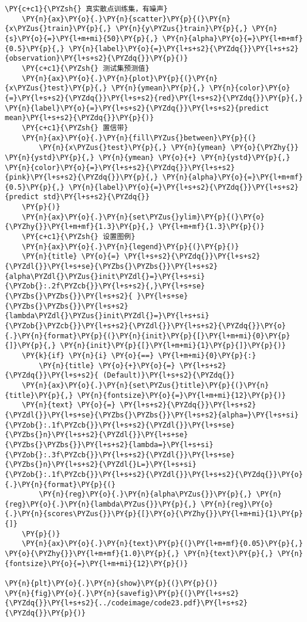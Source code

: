 \begin{Verbatim}[commandchars=\\\{\}]
    \PY{c+c1}{\PYZsh{} 真实散点训练集，有噪声}
    \PY{n}{ax}\PY{o}{.}\PY{n}{scatter}\PY{p}{(}\PY{n}{x\PYZus{}train}\PY{p}{,} \PY{n}{y\PYZus{}train}\PY{p}{,} \PY{n}{s}\PY{o}{=}\PY{l+m+mi}{50}\PY{p}{,} \PY{n}{alpha}\PY{o}{=}\PY{l+m+mf}{0.5}\PY{p}{,} \PY{n}{label}\PY{o}{=}\PY{l+s+s2}{\PYZdq{}}\PY{l+s+s2}{observation}\PY{l+s+s2}{\PYZdq{}}\PY{p}{)}
    \PY{c+c1}{\PYZsh{} 测试集预测值}
    \PY{n}{ax}\PY{o}{.}\PY{n}{plot}\PY{p}{(}\PY{n}{x\PYZus{}test}\PY{p}{,} \PY{n}{ymean}\PY{p}{,} \PY{n}{color}\PY{o}{=}\PY{l+s+s2}{\PYZdq{}}\PY{l+s+s2}{red}\PY{l+s+s2}{\PYZdq{}}\PY{p}{,} \PY{n}{label}\PY{o}{=}\PY{l+s+s2}{\PYZdq{}}\PY{l+s+s2}{predict mean}\PY{l+s+s2}{\PYZdq{}}\PY{p}{)}
    \PY{c+c1}{\PYZsh{} 置信带}
    \PY{n}{ax}\PY{o}{.}\PY{n}{fill\PYZus{}between}\PY{p}{(}
        \PY{n}{x\PYZus{}test}\PY{p}{,} \PY{n}{ymean} \PY{o}{\PYZhy{}} \PY{n}{ystd}\PY{p}{,} \PY{n}{ymean} \PY{o}{+} \PY{n}{ystd}\PY{p}{,} \PY{n}{color}\PY{o}{=}\PY{l+s+s2}{\PYZdq{}}\PY{l+s+s2}{pink}\PY{l+s+s2}{\PYZdq{}}\PY{p}{,} \PY{n}{alpha}\PY{o}{=}\PY{l+m+mf}{0.5}\PY{p}{,} \PY{n}{label}\PY{o}{=}\PY{l+s+s2}{\PYZdq{}}\PY{l+s+s2}{predict std}\PY{l+s+s2}{\PYZdq{}}
    \PY{p}{)}
    \PY{n}{ax}\PY{o}{.}\PY{n}{set\PYZus{}ylim}\PY{p}{(}\PY{o}{\PYZhy{}}\PY{l+m+mf}{1.3}\PY{p}{,} \PY{l+m+mf}{1.3}\PY{p}{)}
    \PY{c+c1}{\PYZsh{} 设置图例}
    \PY{n}{ax}\PY{o}{.}\PY{n}{legend}\PY{p}{(}\PY{p}{)}
    \PY{n}{title} \PY{o}{=} \PY{l+s+s2}{\PYZdq{}}\PY{l+s+s2}{\PYZdl{}}\PY{l+s+se}{\PYZbs{}\PYZbs{}}\PY{l+s+s2}{alpha\PYZdl{}\PYZus{}init\PYZdl{}=}\PY{l+s+si}{\PYZob{}:.2f\PYZcb{}}\PY{l+s+s2}{,}\PY{l+s+se}{\PYZbs{}\PYZbs{}}\PY{l+s+s2}{ }\PY{l+s+se}{\PYZbs{}\PYZbs{}}\PY{l+s+s2}{lambda\PYZdl{}\PYZus{}init\PYZdl{}=}\PY{l+s+si}{\PYZob{}\PYZcb{}}\PY{l+s+s2}{\PYZdl{}}\PY{l+s+s2}{\PYZdq{}}\PY{o}{.}\PY{n}{format}\PY{p}{(}\PY{n}{init}\PY{p}{[}\PY{l+m+mi}{0}\PY{p}{]}\PY{p}{,} \PY{n}{init}\PY{p}{[}\PY{l+m+mi}{1}\PY{p}{]}\PY{p}{)}
    \PY{k}{if} \PY{n}{i} \PY{o}{==} \PY{l+m+mi}{0}\PY{p}{:}
        \PY{n}{title} \PY{o}{+}\PY{o}{=} \PY{l+s+s2}{\PYZdq{}}\PY{l+s+s2}{ (Default)}\PY{l+s+s2}{\PYZdq{}}
    \PY{n}{ax}\PY{o}{.}\PY{n}{set\PYZus{}title}\PY{p}{(}\PY{n}{title}\PY{p}{,} \PY{n}{fontsize}\PY{o}{=}\PY{l+m+mi}{12}\PY{p}{)}
    \PY{n}{text} \PY{o}{=} \PY{l+s+s2}{\PYZdq{}}\PY{l+s+s2}{\PYZdl{}}\PY{l+s+se}{\PYZbs{}\PYZbs{}}\PY{l+s+s2}{alpha=}\PY{l+s+si}{\PYZob{}:.1f\PYZcb{}}\PY{l+s+s2}{\PYZdl{}}\PY{l+s+se}{\PYZbs{}n}\PY{l+s+s2}{\PYZdl{}}\PY{l+s+se}{\PYZbs{}\PYZbs{}}\PY{l+s+s2}{lambda=}\PY{l+s+si}{\PYZob{}:.3f\PYZcb{}}\PY{l+s+s2}{\PYZdl{}}\PY{l+s+se}{\PYZbs{}n}\PY{l+s+s2}{\PYZdl{}L=}\PY{l+s+si}{\PYZob{}:.1f\PYZcb{}}\PY{l+s+s2}{\PYZdl{}}\PY{l+s+s2}{\PYZdq{}}\PY{o}{.}\PY{n}{format}\PY{p}{(}
        \PY{n}{reg}\PY{o}{.}\PY{n}{alpha\PYZus{}}\PY{p}{,} \PY{n}{reg}\PY{o}{.}\PY{n}{lambda\PYZus{}}\PY{p}{,} \PY{n}{reg}\PY{o}{.}\PY{n}{scores\PYZus{}}\PY{p}{[}\PY{o}{\PYZhy{}}\PY{l+m+mi}{1}\PY{p}{]}
    \PY{p}{)}
    \PY{n}{ax}\PY{o}{.}\PY{n}{text}\PY{p}{(}\PY{l+m+mf}{0.05}\PY{p}{,} \PY{o}{\PYZhy{}}\PY{l+m+mf}{1.0}\PY{p}{,} \PY{n}{text}\PY{p}{,} \PY{n}{fontsize}\PY{o}{=}\PY{l+m+mi}{12}\PY{p}{)}

\PY{n}{plt}\PY{o}{.}\PY{n}{show}\PY{p}{(}\PY{p}{)}
\PY{n}{fig}\PY{o}{.}\PY{n}{savefig}\PY{p}{(}\PY{l+s+s2}{\PYZdq{}}\PY{l+s+s2}{../codeimage/code23.pdf}\PY{l+s+s2}{\PYZdq{}}\PY{p}{)}
\end{Verbatim}
